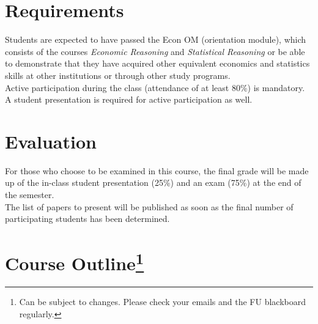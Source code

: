 \documentclass{article}
\begin{document}
\section*{Requirements}
Students are expected to have passed the Econ OM (orientation module), which consists of the courses \textit{Economic Reasoning} and \textit{Statistical Reasoning} or be able to demonstrate that they have acquired other equivalent economics and statistics skills at other institutions or through other study programs.  \\
Active participation during the class (attendance of at least 80\%) is mandatory. A student presentation is required for active participation as well.
\section*{Evaluation}
For those who choose to be examined in this course, the final grade will be made up of the in-class student presentation (25\%) and an exam (75\%) at the end of the semester. \\
The list of papers to present will be published as soon as the final number of participating students has been determined. 
\section*{Course Outline\footnote{Can be subject to changes. Please check your emails and the FU blackboard regularly.}}
\thispagestyle{empty}
\end{document}
